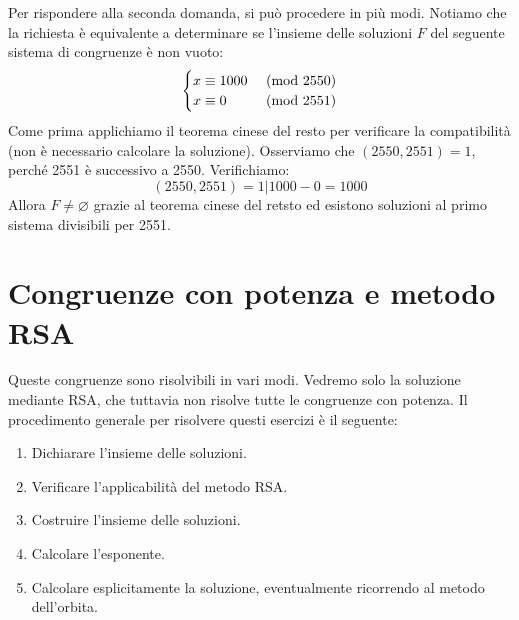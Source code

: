 \begin{tcolorbox}[enhanced, breakable, colback=blue!30, colframe=blue!30!black, title=Esempio]
Per rispondere alla seconda domanda, si può procedere in più modi. Notiamo
che la richiesta è equivalente a determinare se l'insieme delle soluzioni
$F$ del seguente sistema di congruenze è non vuoto:
\[
\begin{cases}
    x\equiv 1000 &\ (\mathrm{mod}\ 2550)\\
    x\equiv 0    &\ (\mathrm{mod}\ 2551)
\end{cases}
\]
Come prima applichiamo il teorema cinese del resto per verificare la
compatibilità (non è necessario calcolare la soluzione). Osserviamo
che $(2550,2551)=1$, perché 2551 è successivo a 2550. Verifichiamo:
\[ (2550,2551)=1|1000-0=1000 \]
Allora $F\not=\varnothing$ grazie al teorema cinese del
retsto ed esistono soluzioni al primo sistema divisibili
per 2551.
\end{tcolorbox}


\newpage
\section{Congruenze con potenza e metodo RSA}
Queste congruenze sono risolvibili in vari modi. Vedremo solo la soluzione
mediante RSA, che tuttavia non risolve tutte le congruenze con potenza. Il
procedimento generale per risolvere questi esercizi è il seguente:
\begin{enumerate}
\item Dichiarare l'insieme delle soluzioni.
\item Verificare l'applicabilità del metodo RSA.
\item Costruire l'insieme delle soluzioni.
\item Calcolare l'esponente.
\item Calcolare esplicitamente la soluzione, eventualmente ricorrendo
al metodo dell'orbita.
\end{enumerate}

